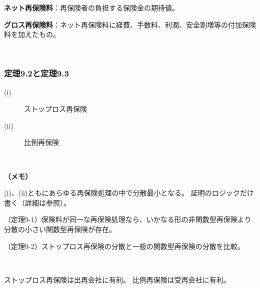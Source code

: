 \begin{sol}
$ $

\textbf{ネット再保険料}：再保険者の負担する保険金の期待値。

\textbf{グロス再保険料}：ネット再保険料に経費、手数料、利潤、安全割増等の付加保険料を加えたもの。

\end{sol}

\



\newpage

\subsubsection{定理9.2と定理9.3}

\begin{sol}
  \;

  \begin{description}
    \item[(i)] ストップロス再保険
    \item[(ii)] 比例再保険
  \end{description}
\end{sol}

\

\textbf{（メモ）}

(i)、(ii)ともにあらゆる再保険処理の中で分散最小となる。
証明のロジックだけ書く（詳細は\cite{教科書}参照）。

（定理9-1）保険料が同一な再保険処理なら、いかなる形の非関数型再保険より分散の小さい関数型再保険が存在。

（定理9-2）ストップロス再保険の分散と一般の関数型再保険の分散を比較。


\

ストップロス再保険は出再会社に有利。
比例再保険は受再会社に有利。


